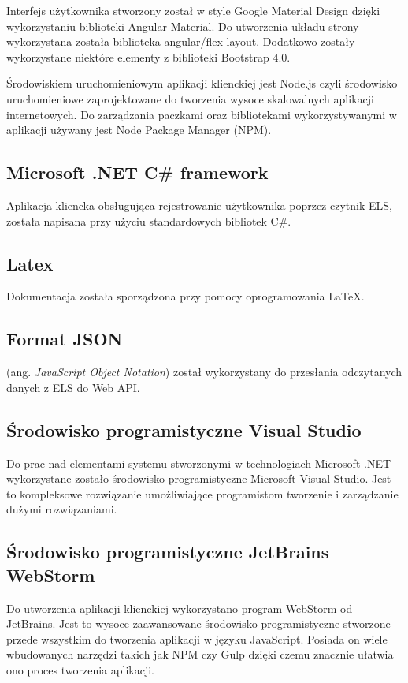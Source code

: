 Interfejs użytkownika stworzony został w style Google Material Design dzięki wykorzystaniu biblioteki Angular Material. Do utworzenia układu strony wykorzystana została biblioteka angular/flex-layout. Dodatkowo zostały wykorzystane niektóre elementy z biblioteki Bootstrap 4.0.

Środowiskiem uruchomieniowym aplikacji klienckiej jest Node.js czyli środowisko uruchomieniowe zaprojektowane do tworzenia wysoce skalowalnych aplikacji internetowych. Do zarządzania paczkami oraz bibliotekami wykorzystywanymi w aplikacji używany jest Node Package Manager (NPM).
\subsection{Microsoft .NET C# framework}
Aplikacja kliencka obsługująca rejestrowanie użytkownika poprzez czytnik ELS, została napisana przy użyciu standardowych bibliotek C#.
\subsection{Latex}
Dokumentacja została sporządzona przy pomocy oprogramowania LaTeX.
\subsection{Format JSON}
(ang. \textit{JavaScript Object Notation}) został wykorzystany do przesłania odczytanych danych z ELS do Web API.
\subsection{Środowisko programistyczne Visual Studio}
Do prac nad elementami systemu stworzonymi w technologiach Microsoft .NET wykorzystane zostało środowisko programistyczne Microsoft Visual Studio. Jest to kompleksowe rozwiązanie umożliwiające programistom tworzenie i zarządzanie dużymi rozwiązaniami.
\subsection{Środowisko programistyczne JetBrains WebStorm}
Do utworzenia aplikacji klienckiej wykorzystano program WebStorm od JetBrains. Jest to wysoce zaawansowane środowisko programistyczne stworzone przede wszystkim do tworzenia aplikacji w języku JavaScript. Posiada on wiele wbudowanych narzędzi takich jak NPM czy Gulp dzięki czemu znacznie ułatwia ono proces tworzenia aplikacji.